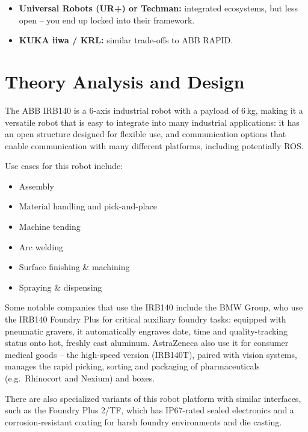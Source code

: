 \documentclass[11pt,a4paper]{report}
\begin{document}
\begin{itemize}
  \item \textbf{Universal Robots (UR+) or Techman:} integrated ecosystems, but less open -- you
  end up locked into their framework.
  \item \textbf{KUKA iiwa / KRL:} similar trade-offs to ABB RAPID.
\end{itemize}

\chapter{Theory Analysis and Design}

The ABB IRB140 is a 6-axis industrial robot with a payload of 6\,kg, making it a versatile robot
that is easy to integrate into many industrial applications: it has an open structure designed for
flexible use, and communication options that enable communication with many different platforms,
including potentially ROS.

Use cases for this robot include:
\begin{itemize}
  \item Assembly
  \item Material handling and pick-and-place
  \item Machine tending
  \item Arc welding
  \item Surface finishing \& machining
  \item Spraying \& dispensing
\end{itemize}

Some notable companies that use the IRB140 include the BMW Group, who use the IRB140 Foundry Plus
for critical auxiliary foundry tasks: equipped with pneumatic gravers, it automatically engraves
date, time and quality-tracking status onto hot, freshly cast aluminum. AstraZeneca also use it for
consumer medical goods -- the high-speed version (IRB140T), paired with vision systems, manages the
rapid picking, sorting and packaging of pharmaceuticals (e.g.\ Rhinocort and Nexium) and boxes.

There are also specialized variants of this robot platform with similar interfaces, such as the
Foundry Plus 2/TF, which has IP67-rated sealed electronics and a corrosion-resistant coating for
harsh foundry environments and die casting.
\end{document}
